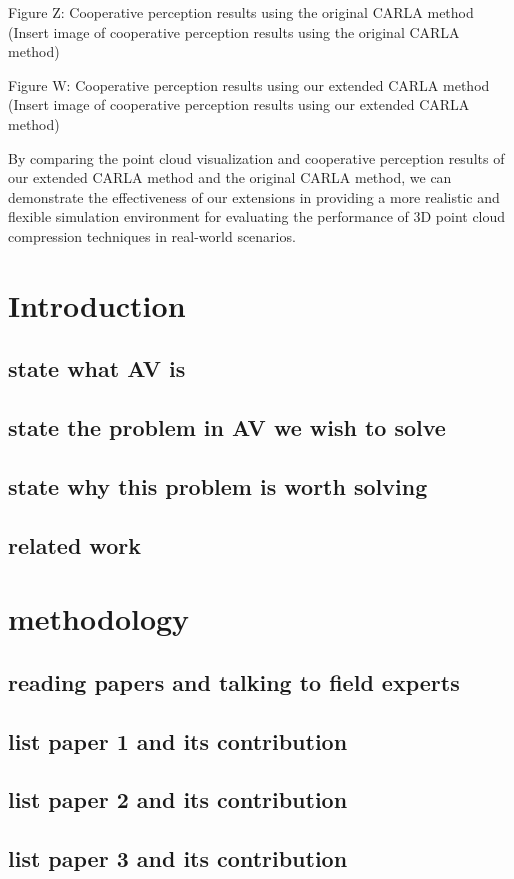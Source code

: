 \documentclass[conference]{IEEEtran}
\begin{document}
Figure Z: Cooperative perception results using the original CARLA method
(Insert image of cooperative perception results using the original CARLA method)

Figure W: Cooperative perception results using our extended CARLA method
(Insert image of cooperative perception results using our extended CARLA method)

By comparing the point cloud visualization and cooperative perception results of our extended CARLA method and the original CARLA method, we can demonstrate the effectiveness of our extensions in providing a more realistic and flexible simulation environment for evaluating the performance of 3D point cloud compression techniques in real-world scenarios.
\section{Introduction}
\subsection{state what AV is}
\subsection{state the problem in AV we wish to solve}
\subsection{state why this problem is worth solving}
\subsection{related work}

\section{methodology}
\subsection{reading papers and talking to field experts}
\subsection{list paper 1 and its contribution}
\subsection{list paper 2 and its contribution}
\subsection{list paper 3 and its contribution}
\end{document}
